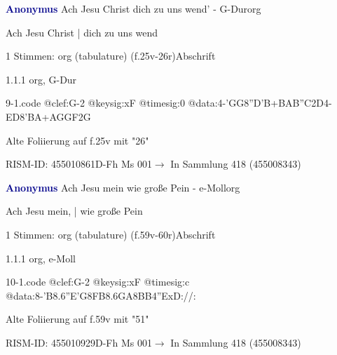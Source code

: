 \documentclass[twocolumn]{book}
\begin{document}
\par \vspace{7pt} \textcolor{darkblue}{\textbf{Anonymus  }}\hfillplus{\textbf{[9]}}\newline Ach Jesu Christ dich zu uns wend' - G-Dur\newline org
\par \begin{itshape}[f.25v, at left:] Ach Jesu Christ | dich zu uns wend\end{itshape} 
\par \textcolor{darkblue}{}  1 Stimmen: org (tabulature)  (f.25v-26r)\newline Abschrift
\par 1.1.1  org, G-Dur  
\begin{filecontents*}{9-1.code}
@clef:G-2
@keysig:xF
@timesig:0
@data:4-'GG{8''D'B+}{BAB''C}2D4-ED{8'BA+}{AGGF}2G
\end{filecontents*}
\newline
%
\par Alte Foliierung auf f.25v mit "26"
\par RISM-ID: 455010861\newline D-Fh  Ms 001\newline $\rightarrow$ In Sammlung 418 (455008343)
      
\par \vspace{7pt} \textcolor{darkblue}{\textbf{Anonymus  }}\hfillplus{\textbf{[10]}}\newline Ach Jesu mein wie große Pein - e-Moll\newline org
\par \begin{itshape}[f.59v, at left:] Ach Jesu mein, | wie große Pein\end{itshape} 
\par \textcolor{darkblue}{}  1 Stimmen: org (tabulature)  (f.59v-60r)\newline Abschrift
\par 1.1.1  org, e-Moll  
\begin{filecontents*}{10-1.code}
@clef:G-2
@keysig:xF
@timesig:c
@data:8-{'B8.6''E'G}{8FB8.6GA}{8BB}4''ExD://:
\end{filecontents*}
\newline
%
\par Alte Foliierung auf f.59v mit "51"
\par RISM-ID: 455010929\newline D-Fh  Ms 001\newline $\rightarrow$ In Sammlung 418 (455008343)
      
\end{document}
